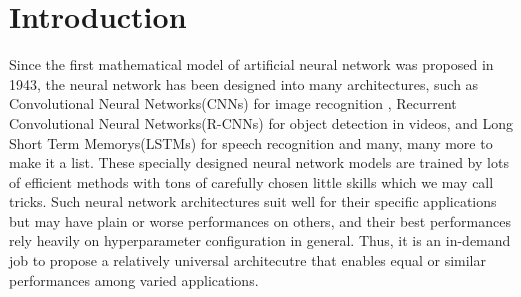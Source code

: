 \documentclass[3p,times,procedia]{elsarticle}
\begin{document}


\section{Introduction}
\label{main}
Since the first mathematical model 
of artificial neural network was 
proposed in 1943\cite{mcculloch1943logical}, 
the neural network has been 
designed into many architectures, 
such as Convolutional Neural 
Networks(CNNs) for image 
recognition
\cite{krizhevsky2012imagenet}, 
Recurrent Convolutional Neural 
Networks(R-CNNs) for object 
detection in 
videos\cite{girshick2015fast}, 
and Long Short Term Memorys(LSTMs)
for speech recognition
\cite{graves2013hybrid} and many, 
many more to make it a list. 
These specially designed neural 
network models are trained by 
lots of efficient methods with 
tons of carefully chosen little 
skills which we may call tricks. 
Such neural network architectures
suit well for their specific 
applications but may have plain 
or worse performances on others, 
and their best performances 
rely heavily on hyperparameter 
configuration in general. Thus, 
it is an in-demand job to propose 
a relatively universal 
architecutre that enables equal 
or similar performances among 
varied applications.
\end{document}

